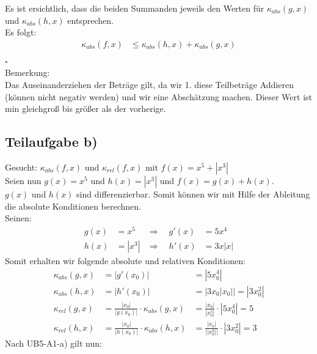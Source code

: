\documentclass{llncs}
\begin{document}
Es ist ersichtlich, dass die beiden Summanden jeweils den Werten für $\kappa_{abs}(g,x)$ und $\kappa_{abs}(h,x)$ entsprechen.\\
Es folgt:\\
\begin{align*}
\kappa_{abs}(f,x)&\le \kappa_{abs}(h,x)+\kappa_{abs}(g,x) \\
\end{align*} \hfill $\square$\\
Bemerkung:\\ Das Auseinanderziehen der Beträge gilt, da wir 1. diese Teilbeträge Addieren (können nicht negativ werden) und wir eine Abschätzung machen. Dieser Wert ist min gleichgroß bis größer als der vorherige.

\subsection*{Teilaufgabe b)}
Gesucht: $\kappa_{abs}(f,x)$ und $\kappa_{rel}(f,x)$ mit $f(x)= x^5 + |x^3|$\\
Seien nun $g(x)=x^5$ und $h(x)=|x^3|$ und $f(x)=g(x)+h(x)$.\\
$g(x)$ und $h(x)$ sind differenzierbar. Somit können wir mit Hilfe der Ableitung die absolute Konditionen berechnen.\\
Seinen:
\begin{align*}
g(x)&=x^5  &\Rightarrow \quad g'(x)&= 5x^4\\
h(x)&=|x^3|  &\Rightarrow \quad h'(x)&= 3x|x| 
\end{align*}
Somit erhalten wir folgende absolute und relativen Konditionen:\\
\begin{align*}
\kappa_{abs}(g,x) &=|g'(x_0)| &= |5x_0^4| \\
\kappa_{abs}(h,x) &=|h'(x_0)| &= |3x_0|x_0|| = |3x_0^2| \\
\kappa_{rel}(g,x) &= \frac{|x_0|}{|g(x_0)|}\cdot\kappa_{abs}(g,x)  &= \frac{|x_0|}{|x_0^5|}\cdot|5x_0^4| = 5\\
\kappa_{rel}(h,x) &=\frac{|x_0|}{|h(x_0)|}\cdot\kappa_{abs}(h,x)  &= \frac{|x_0|}{||x_0^3||}\cdot|3x_0^2| = 3
\end{align*}
Nach UB5-A1-a) gilt nun: 
\end{document}
